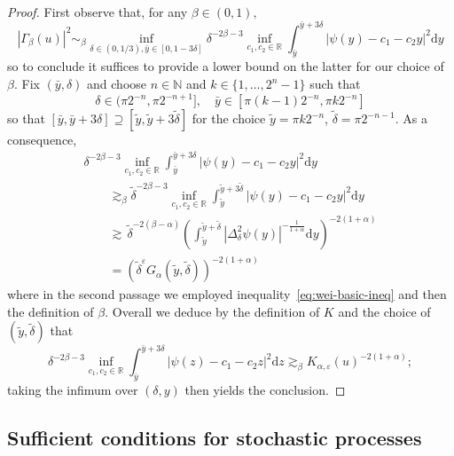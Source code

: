 \documentclass[11pt,oneside,reqno]{amsart}
\newcommand{\mathd}{\mathrm{d}}
\numberwithin{equation}{section}
\begin{document}
\begin{proof}
  First observe that, for any $\beta \in (0, 1),$
  \[ | \Gamma_{\beta} (u) |^2 \sim_{\beta} \inf_{\delta \in (0, 1 / 3),
     \bar{y} \in [0, 1 - 3 \delta]} \delta^{- 2 \beta - 3} \inf_{c_1, c_2 \in
     \mathbb{R}} \int_{\bar{y}}^{\bar{y} + 3 \delta} | \psi (y) - c_1 - c_2 y
     |^2 \mathd y \]
  so to conclude it suffices to provide a lower bound on the latter for our
  choice of $\beta$. Fix $(\bar{y}, \delta)$ and choose $n \in \mathbb{N}$ and
  $k \in \{ 1, \ldots, 2^n - 1 \}$ such that
  \[ \delta \in (\pi 2^{- n}, \pi 2^{- n + 1}], \quad \bar{y} \in [\pi (k - 1)
     2^{- n}, \pi k 2^{- n}] \]
  so that $[\bar{y}, \bar{y} + 3 \delta] \supseteq [\tilde{y}, \tilde{y} + 3
  \tilde{\delta}]$ for the choice $\tilde{y} = \pi k 2^{- n}$, $\tilde{\delta}
  = \pi 2^{- n - 1}$. As a consequence,
  \[ \begin{array}{l}
       \delta^{- 2 \beta - 3} \inf_{c_1, c_2 \in \mathbb{R}}
       \int_{\bar{y}}^{\bar{y} + 3 \delta} | \psi (y) - c_1 - c_2 y |^2 \mathd
       y\\
       \qquad \gtrsim_{\beta} \tilde{\delta}^{- 2 \beta - 3} \inf_{c_1, c_2
       \in \mathbb{R}} \int_{\tilde{y}}^{\tilde{y} + 3 \tilde{\delta}} | \psi
       (y) - c_1 - c_2 y |^2 \mathd y\\
       \qquad \gtrsim \, \tilde{\delta}^{- 2 (\beta - \alpha)}  \left(
       \int_{\tilde{y}}^{\tilde{y} + \tilde{\delta}} | \Delta_{\delta}^2 \psi
       (y) |^{- \frac{1}{1 + \alpha}} \mathd y \right)^{- 2 (1 + \alpha)}\\
       \qquad = (\tilde{\delta}^{\varepsilon} G_{\alpha} (\tilde{y},
       \tilde{\delta}))^{- 2 (1 + \alpha)}
     \end{array} \]
  where in the second passage we employed inequality~\eqref{eq:wei-basic-ineq}
  and then the definition of $\beta$. Overall we deduce by the definition of
  $K$ and the choice of $(\tilde{y}, \tilde{\delta})$ that
  \[ \delta^{- 2 \beta - 3} \inf_{c_1, c_2 \in \mathbb{R}}
     \int_{\bar{y}}^{\bar{y} + 3 \delta} | \psi (z) - c_1 - c_2 z |^2 \mathd z
     \gtrsim_{\beta} K_{\alpha, \varepsilon} (u)^{- 2 (1 + \alpha)} ; \]
  taking the infimum over $(\delta, y)$ then yields the conclusion.
\end{proof}

\subsection{Sufficient conditions for stochastic
processes}\label{sec:enhanced-stochastic}
\end{document}
